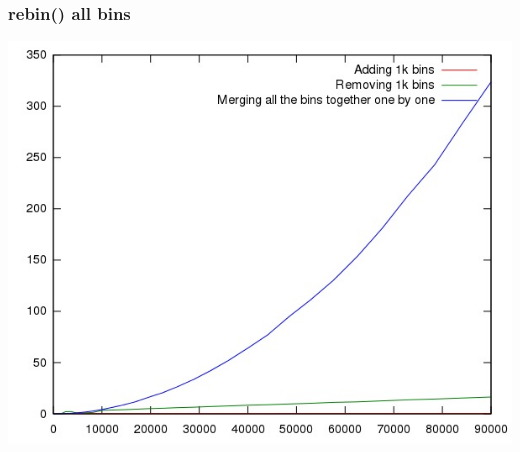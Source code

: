 \documentclass{beamer}
\begin{document}
  \begin{frame}
    \frametitle{rebin() all bins}
    \includegraphics[height=0.89\textheight]{2a.jpg}
  \end{frame}
\end{document}
